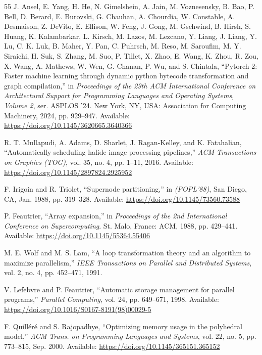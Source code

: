 \documentclass[10pt,twocolumn]{article}
\begin{document}
\begin{thebibliography}{55}
 J. Ansel, E. Yang, H. He, N. Gimelshein, A. Jain, M. Voznesensky, B. Bao, P. Bell, D. Berard, E. Burovski, G. Chauhan, A. Chourdia, W. Constable, A. Desmaison, Z. DeVito, E. Ellison, W. Feng, J. Gong, M. Gschwind, B. Hirsh, S. Huang, K. Kalambarkar, L. Kirsch, M. Lazos, M. Lezcano, Y. Liang, J. Liang, Y. Lu, C. K. Luk, B. Maher, Y. Pan, C. Puhrsch, M. Reso, M. Saroufim, M. Y. Siraichi, H. Suk, S. Zhang, M. Suo, P. Tillet, X. Zhao, E. Wang, K. Zhou, R. Zou, X. Wang, A. Mathews, W. Wen, G. Chanan, P. Wu, and S. Chintala, ``Pytorch 2: Faster machine learning through dynamic python bytecode transformation and graph compilation,'' in \emph{Proceedings of the 29th ACM International Conference on Architectural Support for Programming Languages and Operating Systems, Volume 2}, ser. ASPLOS '24. New York, NY, USA: Association for Computing Machinery, 2024, pp. 929--947. Available: \url{https://doi.org/10.1145/3620665.3640366}

 R. T. Mullapudi, A. Adams, D. Sharlet, J. Ragan-Kelley, and K. Fatahalian, ``Automatically scheduling halide image processing pipelines,'' \emph{ACM Transactions on Graphics (TOG)}, vol. 35, no. 4, pp. 1--11, 2016. Available: \url{https://doi.org/10.1145/2897824.2925952}

 F. Irigoin and R. Triolet, ``Supernode partitioning,'' in \emph{(POPL'88)}, San Diego, CA, Jan. 1988, pp. 319--328. Available: \url{https://doi.org/10.1145/73560.73588}

 P. Feautrier, ``Array expansion,'' in \emph{Proceedings of the 2nd International Conference on Supercomputing}. St. Malo, France: ACM, 1988, pp. 429--441. Available: \url{https://doi.org/10.1145/55364.55406}

 M. E. Wolf and M. S. Lam, ``A loop transformation theory and an algorithm to maximize parallelism,'' \emph{IEEE Transactions on Parallel and Distributed Systems}, vol. 2, no. 4, pp. 452--471, 1991.

 V. Lefebvre and P. Feautrier, ``Automatic storage management for parallel programs,'' \emph{Parallel Computing}, vol. 24, pp. 649--671, 1998. Available: \url{https://doi.org/10.1016/S0167-8191(98)00029-5}

 F. Quill\'er\'e and S. Rajopadhye, ``Optimizing memory usage in the polyhedral model,'' \emph{ACM Trans. on Programming Languages and Systems}, vol. 22, no. 5, pp. 773--815, Sep. 2000. Available: \url{https://doi.org/10.1145/365151.365152}


\end{thebibliography}
\end{document}

